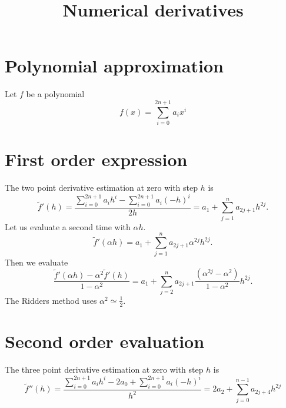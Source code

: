 \documentclass{revtex4}
\begin{document}
	\title{Numerical derivatives}
	\maketitle

\section{Polynomial approximation}
Let $f$ be a polynomial
$$
	f(x) = \sum_{i=0}^{2n+1} a_i x^i
$$

\section{First order expression}
The two point derivative estimation at zero with step $h$ is
$$
	\tilde{f}'(h) = \dfrac{\displaystyle \sum_{i=0}^{2n+1} a_i h^i - \sum_{i=0}^{2n+1} a_i (-h)^i}{2h}
	 = a_1 + \sum_{j=1}^{n} a_{2j+1} h^{2j}.
$$
Let us evaluate a second time with $\alpha h$.
$$
	\tilde{f}'(\alpha h) = a_1 + \sum_{j=1}^{n} a_{2j+1} \alpha^{2j} h^{2j}.
$$
Then we evaluate
$$
	\dfrac{\tilde{f}'(\alpha h) - \alpha^2\tilde{f}'(h)}{1-\alpha^2} = 
	a_1 + \sum_{j=2}^{n} a_{2j+1} \dfrac{\left(\alpha^{2j} - \alpha^2\right)}{1-\alpha^2} h^{2j}.
$$
The Ridders method uses $\alpha^2\simeq\frac{1}{2}$.

\section{Second order evaluation}
The three point derivative estimation at zero with step $h$ is
$$
	\tilde{f}''(h) = 
	\dfrac{\displaystyle \sum_{i=0}^{2n+1} a_i h^i - 2a_0  + \sum_{i=0}^{2n+1} a_i (-h)^i}{h^2}
	= 2a_2 + \sum_{j=0}^{n-1} a_{2j+4} h^{2j}
$$
\end{document}
